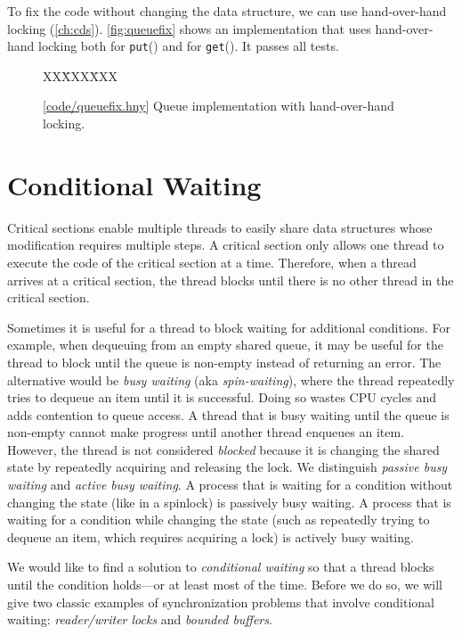 \documentclass{report}
\newcommand{\harmonysource}[1]{
\begin{tabbing}
XX\=XXX\=XXX\kill
    
\end{tabbing}
}
\newcommand{\harmonylink}[1]{%
[\href{https://harmony.cs.cornell.edu/#1}{\underline{#1}}]%
}
\newenvironment{code}{
\tcolorbox
}{
\endtcolorbox
}
\begin{document}
To fix the code without changing the data structure, we can use
hand-over-hand locking (\autoref{ch:cds}).
\autoref{fig:queuefix} shows an implementation
that uses hand-over-hand locking
both for \texttt{put}() and for \texttt{get}().  It passes all tests.

\begin{figure}
\begin{code}
\harmonysource{queuefix}
\end{code}
\caption{\harmonylink{code/queuefix.hny} Queue implementation with hand-over-hand locking.}
\label{fig:queuefix}
\end{figure}

\chapter{Conditional Waiting}
\label{ch:condwait}

Critical sections enable multiple threads
to easily share data structures whose modification
requires multiple steps.
A critical section only allows one thread to execute the code
of the critical section at a time.
Therefore, when a thread arrives at a critical section,
the thread blocks until there is no other thread in the critical section.

%
%
Sometimes it is useful for a thread to block waiting for additional
conditions.
For example, when dequeuing from an empty shared queue,
it may be useful for the thread to block until the queue is non-empty
instead of returning an error.
The alternative would be \emph{busy waiting} (aka \emph{spin-waiting}),
where the thread repeatedly tries to dequeue an item until it is successful.
Doing so wastes CPU cycles and adds contention to queue access.
%
A thread that is busy waiting until the queue is non-empty cannot
make progress until another thread enqueues an item.
However, the thread is not considered \emph{blocked} because it is
changing the shared state by repeatedly acquiring and releasing the
lock.
We distinguish \emph{passive busy waiting} and \emph{active busy waiting}.
A process that is waiting for a condition without changing the state
(like in a spinlock) is passively busy waiting.
A process that is waiting for a condition while changing the state
(such as repeatedly trying to dequeue an item, which requires
acquiring a lock) is actively busy waiting.

We would like to find a solution to \emph{conditional waiting}
so that a thread blocks until the condition holds---or at least most
of the time.
Before we do so, we will give two classic examples of synchronization
problems that involve conditional waiting: \emph{reader/writer locks}
and \emph{bounded buffers}.
\end{document}

